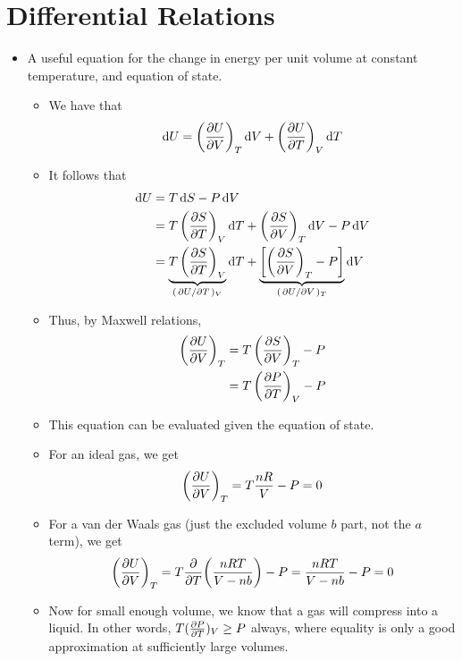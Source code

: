 \documentclass[../notes.tex]{subfiles}
\begin{document}
\section{Differential Relations}
\begin{itemize}
    \item {}A useful equation for the change in energy per unit volume at constant temperature, and equation of state.
    \begin{itemize}
        \item We have that
        \begin{equation*}
            \dd{U} = \left( \pdv{U}{V} \right)_T\dd{V}+\left( \pdv{U}{T} \right)_V\dd{T}
        \end{equation*}
        \item It follows that
        \begin{align*}
            \dd{U} &= T\dd{S}-P\dd{V}\\
            &= T\left( \pdv{S}{T} \right)_V\dd{T}+\left( \pdv{S}{V} \right)_T\dd{V}-P\dd{V}\\
            &= \underbrace{T\left( \pdv{S}{T} \right)_V}_{(\pdv*{U}{T})_V}\dd{T}+\underbrace{\left[ \left( \pdv{S}{V} \right)_T-P \right]}_{(\pdv*{U}{V})_T}\dd{V}
        \end{align*}
        \item Thus, by Maxwell relations,
        \begin{align*}
            \left( \pdv{U}{V} \right)_T &= T\left( \pdv{S}{V} \right)_T-P\\
            &= T\left( \pdv{P}{T} \right)_V-P
        \end{align*}
        \item This equation can be evaluated given the equation of state.
        \item For an ideal gas, we get
        \begin{equation*}
            \left( \pdv{U}{V} \right)_T = T\frac{nR}{V}-P = 0
        \end{equation*}
        \item For a van der Waals gas (just the excluded volume $b$ part, not the $a$ term), we get
        \begin{equation*}
            \left( \pdv{U}{V} \right)_T = T\pdv{T}(\frac{nRT}{V-nb})-P
            = \frac{nRT}{V-nb}-P
            = 0
        \end{equation*}
        \item Now for small enough volume, we know that a gas will compress into a liquid. In other words, $T(\pdv{P}{T})_V\geq P$ always, where equality is only a good approximation at sufficiently large volumes.

\end{itemize}
\end{itemize}
\end{document}

